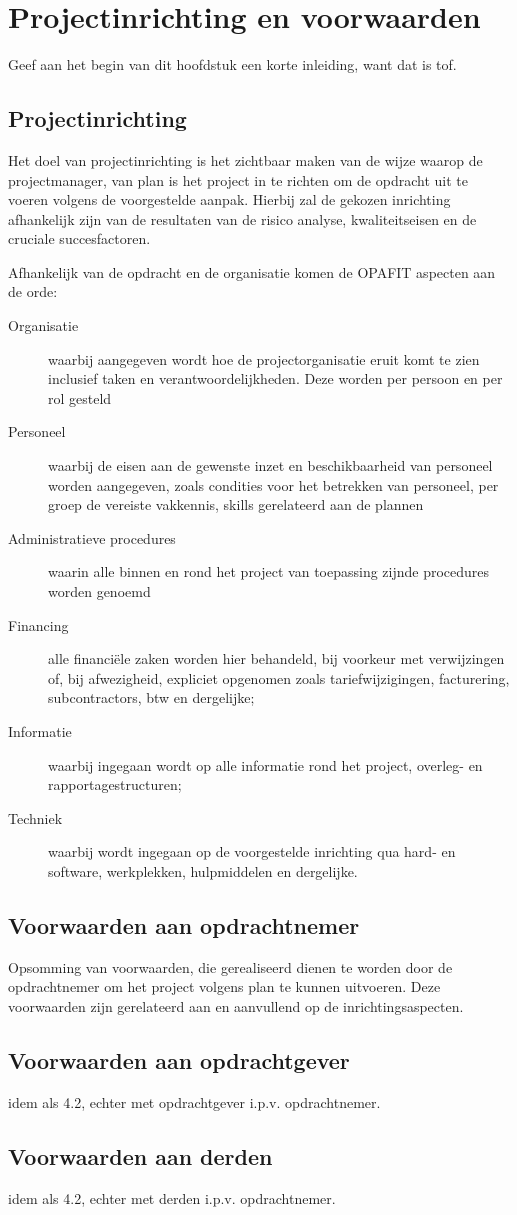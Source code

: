 \section{Projectinrichting en voorwaarden}
\label{projectinrichting}

Geef aan het begin van dit hoofdstuk een korte inleiding, want dat is tof. %

\subsection{Projectinrichting}

Het doel van projectinrichting is het zichtbaar maken van de wijze waarop de projectmanager,
van plan is het project in te richten om de opdracht uit te voeren volgens de voorgestelde aanpak.
Hierbij zal de gekozen inrichting afhankelijk zijn van de resultaten van de risico analyse,
kwaliteitseisen en de cruciale succesfactoren.

Afhankelijk van de opdracht en de organisatie komen de OPAFIT aspecten aan de orde:
\begin{description}
  \item[Organisatie] waarbij aangegeven wordt hoe de projectorganisatie eruit komt te zien inclusief taken en verantwoordelijkheden.
  Deze worden per persoon en per rol gesteld
  \item[Personeel] waarbij de eisen aan de gewenste inzet en beschikbaarheid van personeel worden aangegeven,
  zoals condities voor het betrekken van personeel, per groep de vereiste vakkennis, skills gerelateerd aan de plannen
  \item[Administratieve procedures] waarin alle binnen en rond het project van toepassing zijnde procedures worden genoemd
  \item[Financing] alle financi\"ele zaken worden hier behandeld, bij voorkeur met verwijzingen of, bij afwezigheid,
  expliciet opgenomen zoals tariefwijzigingen, facturering, subcontractors, btw en dergelijke;
  \item[Informatie] waarbij ingegaan wordt op alle informatie rond het project, overleg- en rapportagestructuren;
  \item[Techniek] waarbij wordt ingegaan op de voorgestelde inrichting qua hard- en software, werkplekken, hulpmiddelen en dergelijke.
\end{description}

\subsection{Voorwaarden aan opdrachtnemer}
Opsomming van voorwaarden, die gerealiseerd dienen te worden door de opdrachtnemer om het project volgens plan te kunnen uitvoeren.
Deze voorwaarden zijn gerelateerd aan en aanvullend op de inrichtingsaspecten.

\subsection{Voorwaarden aan opdrachtgever}

idem als 4.2, echter met opdrachtgever i.p.v. opdrachtnemer.

\subsection{Voorwaarden aan derden}

idem als 4.2, echter met derden i.p.v. opdrachtnemer.

